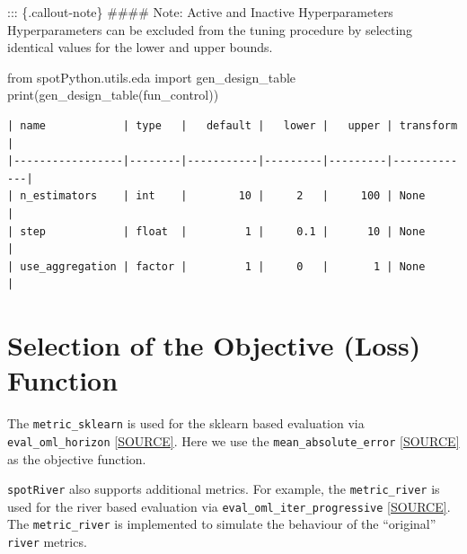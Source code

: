 \documentclass[
  letterpaper,
  DIV=11,
  numbers=noendperiod]{scrreprt}
\newenvironment{Shaded}{\begin{snugshade}}{\end{snugshade}}
\newcommand{\BuiltInTok}[1]{\textcolor[rgb]{0.00,0.23,0.31}{#1}}
\newcommand{\ImportTok}[1]{\textcolor[rgb]{0.00,0.46,0.62}{#1}}
\newcommand{\NormalTok}[1]{\textcolor[rgb]{0.00,0.23,0.31}{#1}}
\begin{document}
::: \{.callout-note\} \#\#\#\# Note: Active and Inactive Hyperparameters
Hyperparameters can be excluded from the tuning procedure by selecting
identical values for the lower and upper bounds.

\begin{Shaded}
\begin{Highlighting}[]
\ImportTok{from}\NormalTok{ spotPython.utils.eda }\ImportTok{import}\NormalTok{ gen\_design\_table}
\BuiltInTok{print}\NormalTok{(gen\_design\_table(fun\_control))}
\end{Highlighting}
\end{Shaded}

\begin{verbatim}
| name            | type   |   default |   lower |   upper | transform   |
|-----------------|--------|-----------|---------|---------|-------------|
| n_estimators    | int    |        10 |     2   |     100 | None        |
| step            | float  |         1 |     0.1 |      10 | None        |
| use_aggregation | factor |         1 |     0   |       1 | None        |
\end{verbatim}

\hypertarget{selection-of-the-objective-loss-function-1}{%
\section{Selection of the Objective (Loss)
Function}\label{selection-of-the-objective-loss-function-1}}

The \texttt{metric\_sklearn} is used for the sklearn based evaluation
via \texttt{eval\_oml\_horizon}
\href{https://github.com/sequential-parameter-optimization/spotRiver/blob/main/src/spotRiver/evaluation/eval_bml.py}{{[}SOURCE{]}}.
Here we use the \texttt{mean\_absolute\_error}
\href{https://scikit-learn.org/stable/modules/generated/sklearn.metrics.mean_absolute_error.html}{{[}SOURCE{]}}
as the objective function.

\begin{tcolorbox}[enhanced jigsaw, left=2mm, toprule=.15mm, colframe=quarto-callout-note-color-frame, leftrule=.75mm, title=\textcolor{quarto-callout-note-color}{\faInfo}\hspace{0.5em}{Note: Additional metrics}, toptitle=1mm, opacitybacktitle=0.6, arc=.35mm, titlerule=0mm, opacityback=0, bottomtitle=1mm, coltitle=black, rightrule=.15mm, colback=white, colbacktitle=quarto-callout-note-color!10!white, breakable, bottomrule=.15mm]

\texttt{spotRiver} also supports additional metrics. For example, the
\texttt{metric\_river} is used for the river based evaluation via
\texttt{eval\_oml\_iter\_progressive}
\href{https://github.com/sequential-parameter-optimization/spotRiver/blob/main/src/spotRiver/evaluation/eval_oml.py}{{[}SOURCE{]}}.
The \texttt{metric\_river} is implemented to simulate the behaviour of
the ``original'' \texttt{river} metrics.

\end{tcolorbox}
\end{document}
